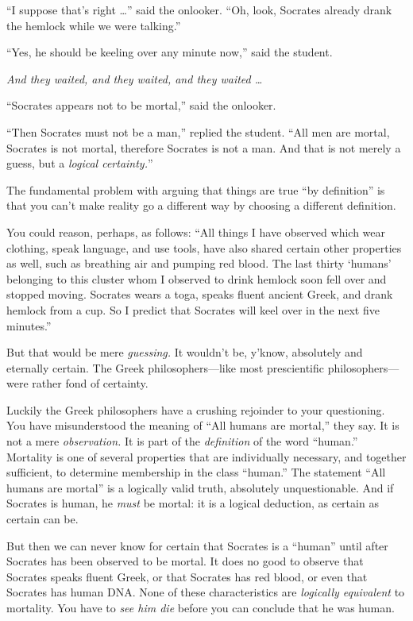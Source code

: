 {
 ``I suppose that's right
\ldots'' said the onlooker. ``Oh,
look, Socrates already drank the hemlock while we were
talking.''}

{
 ``Yes, he should be keeling over any minute
now,'' said the student.}

{
 \textit{And they waited, and they waited, and they waited \ldots}}

{
 ``Socrates appears not to be
mortal,'' said the onlooker.}

{
 ``Then Socrates must not be a
man,'' replied the student. ``All
men are mortal, Socrates is not mortal, therefore Socrates is not a
man. And that is not merely a guess, but a \textit{logical
certainty.}''}

{
 The fundamental problem with arguing that things are true
``by definition'' is that you
can't make reality go a different way by choosing a
different definition.}

{
 You could reason, perhaps, as follows: ``All
things I have observed which wear clothing, speak language, and use
tools, have also shared certain other properties as well, such as
breathing air and pumping red blood. The last thirty
`humans' belonging to this cluster whom
I observed to drink hemlock soon fell over and stopped moving. Socrates
wears a toga, speaks fluent ancient Greek, and drank hemlock from a
cup. So I predict that Socrates will keel over in the next five
minutes.''}

{
 But that would be mere \textit{guessing.} It
wouldn't be, y'know, absolutely and
eternally certain. The Greek philosophers---like most prescientific
philosophers---were rather fond of certainty.}

{
 Luckily the Greek philosophers have a crushing rejoinder to your
questioning. You have misunderstood the meaning of
``All humans are mortal,'' they say.
It is not a mere \textit{observation.} It is part of the
\textit{definition} of the word
``human.'' Mortality is one of
several properties that are individually necessary, and together
sufficient, to determine membership in the class
``human.'' The statement
``All humans are mortal'' is a
logically valid truth, absolutely unquestionable. And if Socrates is
human, he \textit{must} be mortal: it is a logical deduction, as
certain as certain can be.}

{
 But then we can never know for certain that Socrates is a
``human'' until after Socrates has
been observed to be mortal. It does no good to observe that Socrates
speaks fluent Greek, or that Socrates has red blood, or even that
Socrates has human DNA. None of these characteristics are
\textit{logically equivalent} to mortality. You have to \textit{see him
die} before you can conclude that he was human.}

